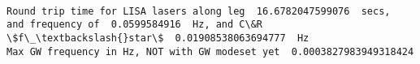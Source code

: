 \documentclass[11pt]{article}
\begin{document}
    \begin{center}
    \end{center}
    { \hspace*{\fill} \\}
    
    \begin{Verbatim}[commandchars=\\\{\}]
Round trip time for LISA lasers along leg  16.6782047599076  secs,  and frequency of  0.0599584916  Hz, and C\&R \$f\_\textbackslash{}star\$  0.01908538063694777  Hz
Max GW frequency in Hz, NOT with GW modeset yet  0.0003827983949318424

    \end{Verbatim}


    
    
    
    
\end{document}

